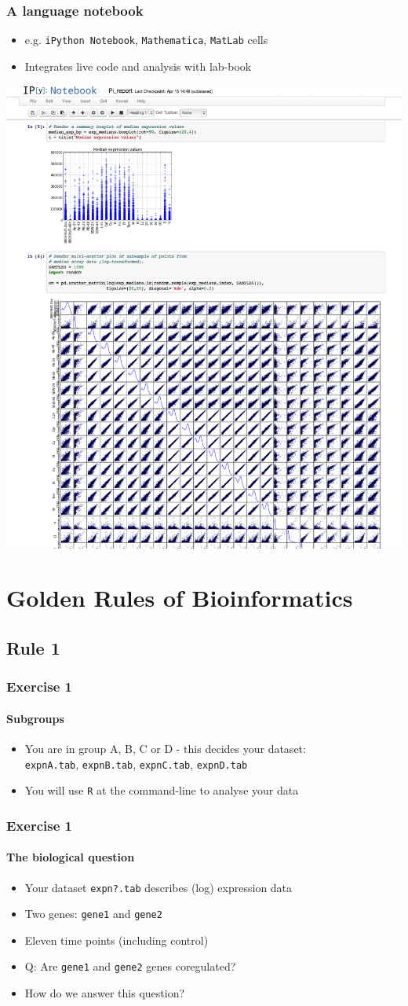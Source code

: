 \documentclass[table]{beamer}
\begin{document}
   \begin{frame}
     \frametitle{A language notebook}
     \begin{itemize}
       \item e.g. \texttt{iPython Notebook}, \texttt{Mathematica}, \texttt{MatLab} cells
       \item Integrates live code and analysis with lab-book
     \end{itemize}
    \includegraphics[width=.5\textwidth]{images/ipython_notebook}     
   \end{frame}


  \section{Golden Rules of Bioinformatics}
  
  \subsection{Rule 1}
  \begin{frame}
    \frametitle{Exercise 1}
    \framesubtitle{Subgroups}
    \begin{itemize}
      \item You are in group A, B, C or D - this decides your dataset: \\
      \texttt{expnA.tab}, \texttt{expnB.tab}, \texttt{expnC.tab}, \texttt{expnD.tab}
      \item You will use \texttt{R} at the command-line to analyse your data
    \end{itemize}
  \end{frame}
  
  \begin{frame}
    \frametitle{Exercise 1}
    \framesubtitle{The biological question}
    \begin{itemize}
      \item Your dataset \texttt{expn?.tab} describes (log) expression data
      \item Two genes: \texttt{gene1} and \texttt{gene2}
      \item Eleven time points (including control)
      \item Q: Are \texttt{gene1} and \texttt{gene2} genes coregulated?
      \item How do we answer this question?
    \end{itemize}
  \end{frame}  
\end{document}
